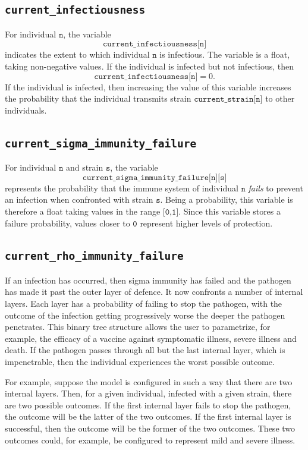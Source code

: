 \documentclass[10pt,letterpaper]{article}
\begin{document}
\subsection*{\texttt{current{\_}infectiousness}}
For individual $\texttt{n}$, the variable $$\texttt{current{\_}infectiousness[n]}$$ indicates the extent to which individual $\texttt{n}$ is infectious. The variable is a float, taking non-negative values. If the individual is infected but not infectious, then $$\texttt{current{\_}infectiousness[n]} = 0.$$ If the individual is infected, then increasing the value of this variable increases the probability that the individual transmits strain $\texttt{current{\_}strain[n]}$ to other individuals.

\subsection*{\texttt{current{\_}sigma{\_}immunity{\_}failure}}
For individual $\texttt{n}$ and strain $\texttt{s}$, the variable $$\texttt{current{\_}sigma{\_}immunity{\_}failure[n][s]}$$ represents the probability that the immune system of individual $\texttt{n}$ \textit{fails} to prevent an infection when confronted with strain $\texttt{s}$. Being a probability, this variable is therefore a float taking values in the range $\texttt{[0,1]}.$ Since this variable stores a failure probability, values closer to $\texttt{0}$ represent higher levels of protection.

\subsection*{\texttt{current{\_}rho{\_}immunity{\_}failure}}
If an infection has occurred, then sigma immunity has failed and the pathogen has made it past the outer layer of defence. It now confronts a number of internal layers. Each layer has a probability of failing to stop the pathogen, with the outcome of the infection getting progressively worse the deeper the pathogen penetrates. This binary tree structure allows the user to parametrize, for example, the efficacy of a vaccine against symptomatic illness, severe illness and death. If the pathogen passes through all but the last internal layer, which is impenetrable, then the individual experiences the worst possible outcome.

For example, suppose the model is configured in such a way that there are two internal layers. Then, for a given individual, infected with a given strain, there are two possible outcomes. If the first internal layer fails to stop the pathogen, the outcome will be the latter of the two outcomes. If the first internal layer is successful, then the outcome will be the former of the two outcomes. These two outcomes could, for example, be configured to represent mild and severe illness.
\end{document}

